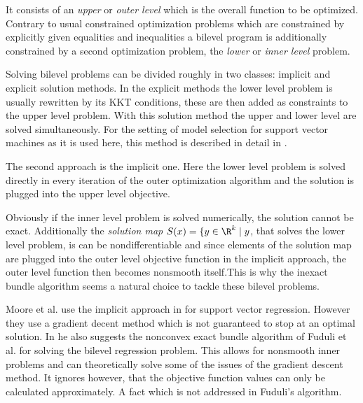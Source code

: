It consists of an \emph{upper} or \emph{outer level} which is the overall function to be optimized. Contrary to usual constrained optimization problems which are constrained by explicitly given equalities and inequalities a  bilevel program is additionally constrained by a second optimization problem, the \emph{lower} or \emph{inner level} problem.

Solving bilevel problems can be divided roughly in two classes: implicit and explicit solution methods. 
In the explicit methods the lower level problem is usually rewritten by its KKT conditions, these are then added as constraints to the upper level problem. With this solution method the upper and lower level are solved simultaneously. For the setting of model selection for support vector machines as it is used here, this method is described in detail in \cite{Kunapuli2008}.

The second approach is the implicit one. Here the lower level problem is solved directly in every iteration of the outer optimization algorithm and the solution is plugged into the upper level objective. 

Obviously if the inner level problem is solved numerically, the solution cannot be exact. Additionally the \emph{solution map} \( S(x) = \{y \in \R^k \mid y\), that solves the lower level problem, is can be nondifferentiable \cite{Outrata1998} and since elements of  the solution map are plugged into the outer level objective function in the implicit approach, the outer level function then becomes nonsmooth itself.This is why the inexact bundle algorithm seems a natural choice to tackle these bilevel problems. 

Moore et al. use the implicit approach in \cite{Moore2011} for support vector regression. However they use a gradient decent method which is not guaranteed to stop at an optimal solution.
In \cite{Moore2010a} he also suggests the nonconvex exact bundle algorithm of Fuduli et al. \cite{Fuduli2004a} for solving the bilevel regression problem. This allows for nonsmooth inner problems and can theoretically solve some of the issues of the gradient descent method. It ignores however, that the objective function values can only be calculated approximately. A fact which is not addressed in Fuduli's algorithm.


